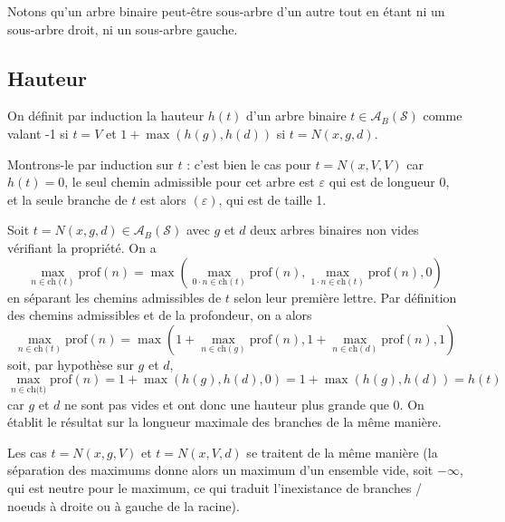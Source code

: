 \documentclass{scrartcl}
\begin{document}
			\rem Notons qu'un arbre binaire peut-être sous-arbre d'un autre tout en étant ni un sous-arbre droit, ni un sous-arbre gauche.

		\subsection{Hauteur}
			On définit par induction la hauteur $h(t)$ d'un arbre binaire $t \in \mathscr{A}_B(\mathcal{S})$ comme valant 
			-1 si $t = V$ et $1 + \max(h(g),h(d))$ si $t = N(x,g,d)$.

			\begin{demo}
				\item Montrons-le par induction sur $t$ : c'est bien le cas pour $t = N(x,V,V)$
					car $h(t) = 0$, 
					le seul chemin admissible pour cet arbre est $\varepsilon$ qui est de longueur 0,
					et la seule branche de $t$ est alors $(\varepsilon)$, qui est de taille 1.

				\item Soit $t = N(x,g,d) \in \mathscr{A}_B(\mathcal{S})$ avec $g$ et $d$ deux arbres binaires non vides vérifiant la propriété.
					On a 
					\[
						\max_{n \in \text{ch}(t)} \mathrm{prof}(n) = \max(\max_{0\cdot n \in \text{ch}(t)} \mathrm{prof}(n), \max_{1\cdot n \in \text{ch}(t)} \mathrm{prof}(n), 0)
					\]
					en séparant les chemins admissibles de $t$ selon leur première lettre.
					Par définition des chemins admissibles et de la profondeur, on a alors 
					\[
						\max_{n \in \text{ch}(t)} \mathrm{prof}(n) = \max(1 + \max_{n \in \text{ch}(g)} \mathrm{prof}(n), 1 + \max_{n \in \text{ch}(d)} \mathrm{prof}(n) , 1)
					\]
					soit, par hypothèse sur $g$ et $d$, 
					\[
						\max_{n \in \text{ch(t)}} \mathrm{prof}(n) = 1 + \max(h(g), h(d), 0) = 1 + \max(h(g), h(d)) = h(t)
					\] 
					car $g$ et $d$ ne sont pas vides et ont donc une hauteur plus grande que 0.
					On établit le résultat sur la longueur maximale des branches de la même manière.
				
				\item Les cas $t = N(x,g,V)$ et $t = N(x,V,d)$ se traitent de la même manière (la séparation des maximums donne alors un maximum d'un ensemble vide, soit $- \infty$, qui est neutre pour le maximum, ce qui traduit l'inexistance de branches / noeuds à droite ou à gauche de la racine).
			\end{demo}
\end{document}
